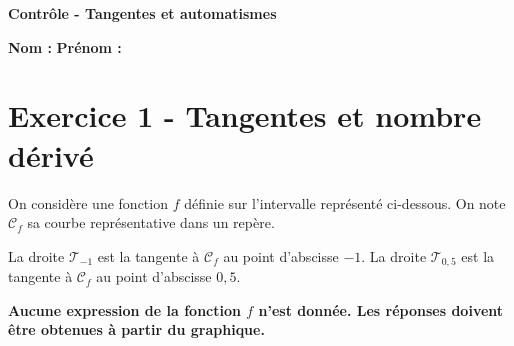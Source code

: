 \documentclass[11pt,a4paper]{article}
\begin{document}
\begin{center}
    {\Large \textbf{Contrôle - Tangentes et automatismes}}\par
    \vspace{0.15cm}
    \textbf{Nom :} \dotfill \hspace{1cm} \textbf{Prénom :} \dotfill
\end{center}

\section*{Exercice 1 - Tangentes et nombre dérivé}

\begin{tcolorbox}[colback=gray!6,colframe=black!45,arc=2mm,left=2mm,right=2mm,top=1mm,bottom=1mm]
On considère une fonction $f$ définie sur l'intervalle représenté ci-dessous. On note $\mathcal C_f$ sa courbe représentative dans un repère.

La droite $\mathcal T_{-1}$ est la tangente à $\mathcal C_f$ au point d'abscisse $-1$.
La droite $\mathcal T_{0{,}5}$ est la tangente à $\mathcal C_f$ au point d'abscisse $0{,}5$.

\textbf{Aucune expression de la fonction $f$ n'est donnée. Les réponses doivent être obtenues à partir du graphique.}
\end{tcolorbox}
\end{document}
